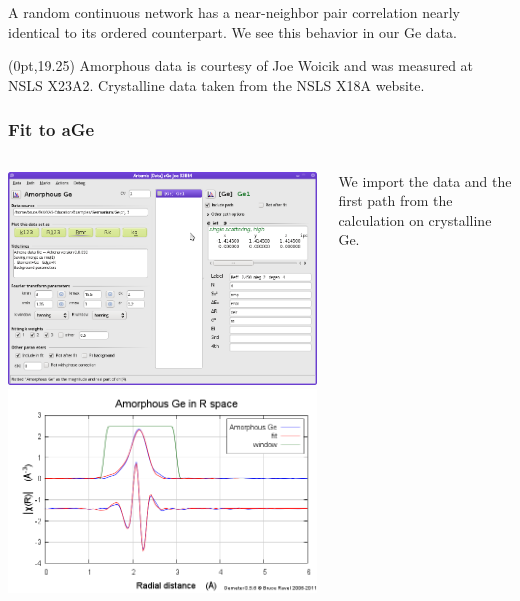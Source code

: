 \documentclass[10pt, xcolor=x11names, compress]{beamer}
\begin{document}
\begin{frame}
\begin{columns}
\begin{column}{0.33\linewidth}
    \end{column}
  \end{columns}

  \bigskip

  A random continuous network has a near-neighbor pair correlation
  nearly identical to its ordered counterpart.  We see this behavior
  in our Ge data.
  \begin{textblock*}{0.5\linewidth}(0pt,19.25\TPVertModule)
    \tiny%
    Amorphous data is courtesy of Joe Woicik and was measured at NSLS
    X23A2.  Crystalline data taken from the NSLS X18A website.
  \end{textblock*}

\end{frame}

\begin{frame}[fragile]
  \frametitle{Fit to aGe}
  \begin{columns}
    \begin{column}{0.4\linewidth}
      \includegraphics[width=\linewidth]{images/aGe_fit.png}\\[2ex]
      \includegraphics[width=\linewidth]{images/aGe_fit_chir.png}
    \end{column}
    \begin{column}{0.6\linewidth}
      We import the data and the first path from the {\feff}
      calculation on crystalline Ge.


\end{column}
\end{columns}
\end{frame}
\end{document}
